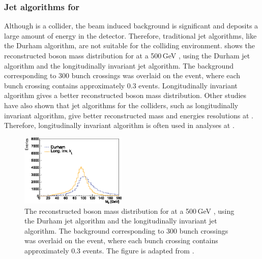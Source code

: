 \subsubsection{Jet algorithms for \CLIC}

Although \CLIC is a \ee collider, the  beam induced background is significant and deposits a large amount of energy in the detector. Therefore, traditional \ee jet algorithms, like the Durham algorithm, are not suitable for the \CLIC colliding environment.  shows the reconstructed \PZ boson mass distribution for  at a 500\,GeV \CLIC \cite{Boronat:2014hva}, using the Durham jet algorithm and the longitudinally invariant \kt jet algorithm. The \ggHad background corresponding to 300 bunch crossings was overlaid on the event, where each bunch crossing contains approximately 0.3 \ggHad events. Longitudinally invariant \kt algorithm gives a better  reconstructed \PZ boson mass distribution. Other studies \cite{Linssen:2012hp,LCD-Note-2010-006} have also shown that jet algorithms for the \pp colliders, such as  longitudinally invariant \kt algorithm,  give better reconstructed mass and energies resolutions at \CLIC. Therefore, longitudinally invariant \kt algorithm is often used in analyses at \CLIC.

\begin{figure}[tbph]
\centering

    \includegraphics[width=0.45\textwidth]{pandora/JetAlgsValencia}

\caption{The reconstructed \PZ boson mass distribution for  at a 500\,GeV \CLIC, using the Durham jet algorithm and the longitudinally invariant \kt jet algorithm. The \ggHad background corresponding to 300 bunch crossings was overlaid on the event, where each bunch crossing contains approximately 0.3 \ggHad events. The figure is adapted from \cite{Boronat:2014hva}.}
\label{fig:pandoraJetCompare}
\end{figure}



